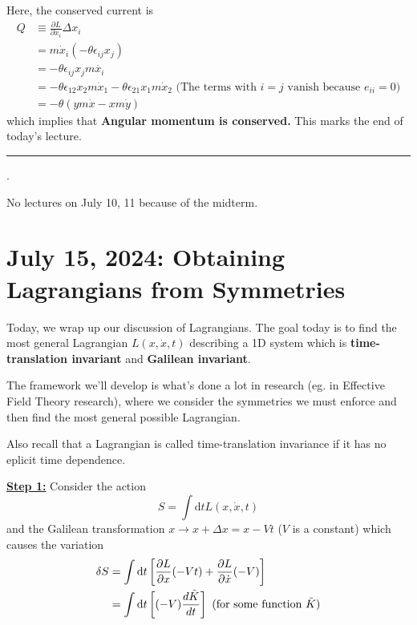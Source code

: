 \documentclass[11pt]{article}
\begin{document}
\vskip 0.5cm
Here, the conserved current is 
\begin{align*}
  Q &\equiv \frac{\partial L}{\partial \dot{x}_i} \Delta x_i \\
  &= m \dot{x}_i \left(-\theta \epsilon_{ij} x_{j}\right) \\
  &= -\theta \epsilon_{ij} x_j m\dot{x_i} \\
  &= -\theta \epsilon_{12} x_2 m\dot{x}_1 - \theta \epsilon_{21} x_1 m \dot{x}_2 \text{  (The terms with $i=j$ vanish because $e_{ii} = 0$)} \\
  &= -\theta(ym\dot{x} - xm\dot{y}) 
\end{align*}
which implies that \textbf{Angular momentum is conserved.} This marks the end of today's lecture.
\hrule

\vskip 1cm.
\begin{note}
{No lectures on July 10, 11 because of the midterm.}
\end{note}


\pagebreak
\section{July 15, 2024: Obtaining Lagrangians from Symmetries}

Today, we wrap up our discussion of Lagrangians. The goal today is to find the most general Lagrangian $L(x, \dot{x}, t)$ describing a 1D system which is \textbf{time-translation invariant} and \textbf{Galilean invariant}.


The framework we'll develop is what's done a lot in research (eg. in Effective Field Theory research), where we consider the symmetries we must enforce and then find the most general possible Lagrangian.

\vskip 0.5cm
Also recall that a Lagrangian is called time-translation invariance if it has no eplicit time dependence. 

\vskip 0.5cm
\textbf{\underline{Step 1:}} Consider the action
\[ S = \int \mathrm{d}t L(x, \dot{x}, t) \]
and the Galilean transformation $x \rightarrow x + \Delta x = x - Vt$ ($V$ is a constant) which causes the variation
\vskip 0.5cm
\begin{align*}
  \delta S &= \int \mathrm{d}t \left[ \frac{\partial L}{\partial x}(-Vt) + \frac{\partial L}{\partial \dot{x}}(-V) \right] \\
  &= \int \mathrm{d}t \left[ (-V)\frac{d \Tilde{K}}{dt} \right]  \text{ (for some function $\Tilde{K}$)} \\
\end{align*}
\end{document}

